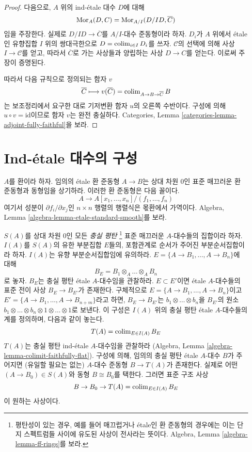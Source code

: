 \begin{proof}
\medskip\noindent
다음으로, $A$ 위의 ind-\'etale 대수 $D$에 대해
$$
\mathop{\mathrm{Mor}}\nolimits_A(D, C) = \mathop{\mathrm{Mor}}\nolimits_{A/I}(D/ID, \overline{C})
$$
임을 주장한다. 실제로 $D/ID \to \overline{C}$를
$A/I$-대수 준동형이라 하자. $D_i$가 $A$ 위에서 \'etale인
유향집합 $I$ 위의 쌍대극한으로
$D = \mathop{\mathrm{colim}}\nolimits_{i \in I} D_i$를 쓰자.
$\mathcal{C}$의 선택에 의해 사상 $I \to \mathcal{C}$를 얻고,
따라서 $\overline{C}$로 가는 사상들과 양립하는 사상
$D \to C$를 얻는다. 이로써 주장이 증명된다.

\medskip\noindent
따라서 다음 규칙으로 정의되는 함자 $v$
$$
\overline{C} 
\longmapsto
v(\overline{C}) = \mathop{\mathrm{colim}}\nolimits_{A \to B \to \overline{C}} B
$$
는 보조정리에서 요구한 대로 기저변환 함자 $u$의 오른쪽 수반이다.
구성에 의해 $u \circ v = \text{id}$이므로 함자 $v$는 완전 충실하다.
Categories, Lemma \ref{categories-lemma-adjoint-fully-faithful}을 보라.
\end{proof}









\section{Ind-\'etale 대수의 구성}
\label{section-construction-ind-etale}

\noindent
$A$를 환이라 하자. 임의의 \'etale 환 준동형 $A \to B$는
상대 차원 $0$인 표준 매끄러운 환 준동형과 동형임을 상기하라.
이러한 환 준동형은 다음 꼴이다.
$$
A \longrightarrow A[x_1, \ldots, x_n]/(f_1, \ldots, f_n)
$$
여기서 성분이 $\partial f_i/\partial x_j$인 $n \times n$ 행렬의
행렬식은 몫환에서 가역이다. Algebra, Lemma
\ref{algebra-lemma-etale-standard-smooth}를 보라.

\medskip\noindent
$S(A)$를 상대 차원 $0$인 모든 {\it 충실 평탄}
\footnote{평탄성이 있는 경우, 예를 들어 매끄럽거나 \'etale인 환 준동형의
경우에는 이는 단지 스펙트럼들 사이에 유도된 사상이 전사라는 뜻이다.
Algebra, Lemma \ref{algebra-lemma-ff-rings}를 보라.}
표준 매끄러운 $A$-대수들의 집합이라 하자.
$I(A)$를 $S(A)$의 유한 부분집합 $E$들의, 포함관계로 순서가 주어진
부분순서집합이라 하자. $I(A)$는 유향 부분순서집합임에 유의하라.
$E = \{A \to B_1, \ldots, A \to B_n\}$에 대해
$$
B_E = B_1 \otimes_A \ldots \otimes_A B_n
$$
로 놓자. $B_E$는 충실 평탄 \'etale $A$-대수임을 관찰하라.
$E \subset E'$이면 \'etale $A$-대수들의 표준 전이 사상
$B_E \to B_{E'}$가 존재한다. 구체적으로
$E = \{A \to B_1, \ldots, A \to B_n\}$이고
$E' = \{A \to B_1, \ldots, A \to B_{n + m}\}$라고 하면,
$B_E \to B_{E'}$는 $b_1 \otimes \ldots \otimes b_n$을
$B_{E'}$의 원소
$b_1 \otimes \ldots \otimes b_n \otimes 1 \otimes \ldots \otimes 1$로
보낸다. 이 구성은 $I(A)$ 위의 충실 평탄 \'etale $A$-대수들의
계를 정의하며, 다음과 같이 놓는다.
$$
T(A) = \mathop{\mathrm{colim}}\nolimits_{E \in I(A)} B_E
$$
$T(A)$는 충실 평탄 ind-\'etale $A$-대수임을 관찰하라
(Algebra, Lemma \ref{algebra-lemma-colimit-faithfully-flat}).
구성에 의해, 임의의 충실 평탄 \'etale $A$-대수 $B$가 주어지면
(유일할 필요는 없는) $A$-대수 준동형 $B \to T(A)$가 존재한다.
실제로 어떤 $(A \to B_0) \in S(A)$와 동형 $B \cong B_0$를 택한다.
그러면 표준 구조 사상
$$
B \to B_0 \to 
T(A) = \mathop{\mathrm{colim}}\nolimits_{E \in I(A)} B_E
$$
이 원하는 사상이다.

